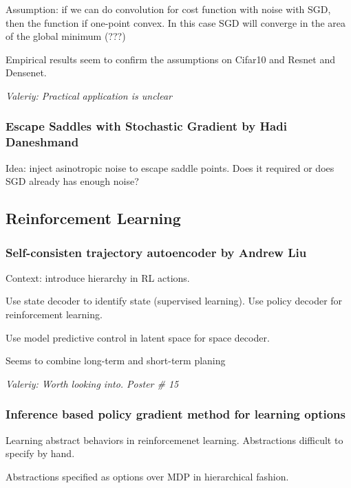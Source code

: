 \documentclass[11pt,oneside,a4paper]{scrartcl}
\newcommand{\valeriy}[1]{{\color{blue}\textit{Valeriy: #1}}}
\begin{document}
Assumption: if we can do convolution for cost function with noise with
SGD, then the function if one-point convex. In this case SGD will
converge in the area of the global minimum (???)

Empirical results seem to confirm the assumptions on Cifar10 and
Resnet and Densenet.

\valeriy{Practical application is unclear}

\subsubsection{Escape Saddles with Stochastic Gradient by Hadi
  Daneshmand \cite{daneshmand18a}}
\label{sec:escape-saddles-with}


Idea: inject asinotropic noise  to escape saddle points. Does it
required or does SGD already has enough noise?

\subsection{Reinforcement Learning}
\label{sec:reinf-learn-2}



\subsubsection{Self-consisten trajectory autoencoder by Andrew Liu \cite{co-reyes18a}}
\label{sec:self-cons-traj}

Context: introduce hierarchy in RL actions.

Use state decoder to identify state (supervised learning). Use policy
decoder for reinforcement learning.

Use model predictive control in latent space for space decoder.

Seems to combine long-term and short-term planing

\valeriy{Worth looking into. Poster \# 15 }

\subsubsection{Inference based policy gradient method for learning
  options \cite{smith18a}}
\label{sec:infer-based-policy}


Learning abstract behaviors in reinforcemenet learning. Abstractions
difficult to specify by hand.

Abstractions specified as options over MDP in hierarchical fashion.
\end{document}
